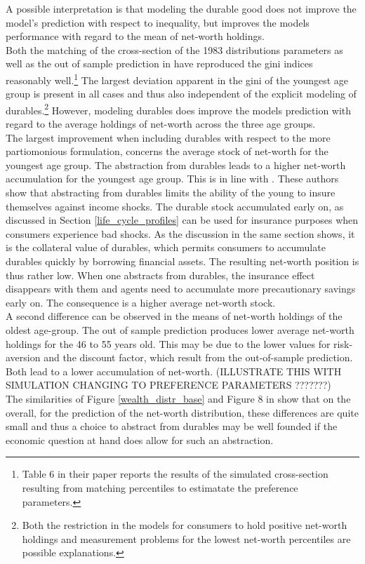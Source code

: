 \documentclass[12pt,a4paper,leqno]{article}
\theoremstyle{definition}
\begin{document}
A possible interpretation is that modeling the durable good does not improve the model's prediction with respect to inequality, but improves the models performance with regard to the mean of net-worth holdings. \\
 Both the matching of the cross-section of the 1983 distributions parameters as well as the out of sample prediction in \cite{hintermaier2011} have reproduced the gini indices reasonably well.\footnote{Table 6 in their paper reports the results of the simulated cross-section resulting from matching percentiles to estimatate the preference parameters.} The largest deviation apparent in the gini of the youngest age group is present in all cases and thus also independent of the explicit modeling of durables.\footnote{Both the restriction in the models for consumers to hold positive net-worth holdings and measurement problems for the lowest net-worth percentiles are possible explanations.} However, modeling durables does improve the models prediction with regard to the average holdings of net-worth across the three age groups. \\ The largest improvement when including durables with respect to the more partiomonious formulation, concerns the average stock of net-worth for the youngest age group. The abstraction from durables leads to a higher net-worth accumulation for the youngest age group. This is in line with \cite{FV&K2011}. These authors show that abstracting from durables limits the ability of the young to insure themselves against income shocks. The durable stock accumulated early on, as discussed in Section \ref{life_cycle_profiles} can be used for insurance purposes when consumers experience bad shocks. As the discussion in the same section shows, it is the collateral value of durables, which permits consumers to accumulate durables quickly by borrowing financial assets. The resulting net-worth position is thus rather low. When one abstracts from durables, the insurance effect disappears with them and agents need to accumulate more precautionary savings early on. The consequence is a higher average net-worth stock. \\ 
A second difference can be observed in the means of net-worth holdings of the oldest age-group. The out of sample prediction produces lower average net-worth holdings for the 46 to 55 years old. This may be due to the lower values for risk-aversion and the discount factor, which result from the out-of-sample prediction. Both lead to a lower accumulation of net-worth. (ILLUSTRATE THIS WITH SIMULATION CHANGING TO PREFERENCE PARAMETERS ???????)
\\
The similarities of Figure \ref{wealth_distr_base} and Figure 8 in \cite{hintermaier2011} show that on the overall, for the prediction of the net-worth distribution, these differences are quite small and thus a choice to abstract from durables may be well founded if the economic question at hand does allow for such an abstraction.  
\end{document}
